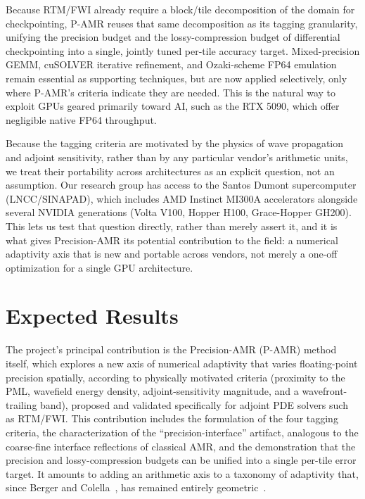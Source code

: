 \documentclass[12pt,a4paper]{article}
\newcommand{\pamr}{P\nobreakdash-AMR}
\begin{document}
Because RTM/FWI already require a block/tile decomposition of the domain
for checkpointing, \pamr{} reuses that same decomposition as its tagging
granularity, unifying the precision budget and the lossy-compression budget
of differential checkpointing into a single, jointly tuned per-tile accuracy
target. Mixed-precision GEMM, cuSOLVER iterative refinement, and
Ozaki-scheme FP64 emulation remain essential as supporting techniques, but
are now applied selectively, only where \pamr{}'s criteria indicate they are
needed. This is the natural way to exploit GPUs geared primarily toward AI,
such as the RTX 5090, which offer negligible native FP64 throughput.

Because the tagging criteria are motivated by the physics of wave
propagation and adjoint sensitivity, rather than by any particular vendor's
arithmetic units, we treat their portability across architectures as an
explicit question, not an assumption. Our research group has access to the
Santos Dumont supercomputer (LNCC/SINAPAD), which includes AMD Instinct
MI300A accelerators alongside several NVIDIA generations (Volta V100, Hopper
H100, Grace-Hopper GH200). This lets us test that question directly, rather
than merely assert it, and it is what gives Precision-AMR its potential
contribution to the field: a numerical adaptivity axis that is new and
portable across vendors, not merely a one-off optimization for a single GPU
architecture.

\section{Expected Results}

The project's principal contribution is the Precision-AMR (\pamr{}) method
itself, which explores a new axis of numerical adaptivity that varies
floating-point precision spatially, according to physically motivated
criteria (proximity to the PML, wavefield energy density, adjoint-sensitivity
magnitude, and a wavefront-trailing band), proposed and validated
specifically for adjoint PDE solvers such as RTM/FWI. This contribution
includes the formulation of the four tagging criteria, the characterization
of the ``precision-interface'' artifact, analogous to the coarse-fine
interface reflections of classical AMR, and the demonstration that the
precision and lossy-compression budgets can be unified into a single
per-tile error target. It amounts to adding an arithmetic axis to a
taxonomy of adaptivity that, since Berger and Colella~\cite{berger1989amr},
has remained entirely geometric~\cite{vivarelli2025review}.
\end{document}
